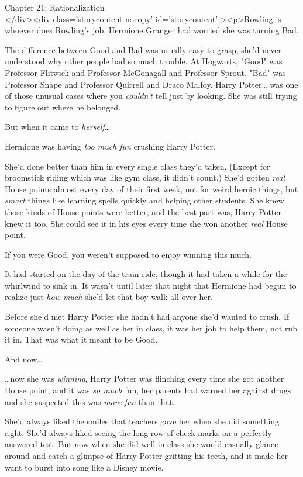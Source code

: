 
Chapter 21: Rationalization\\
</div><div  class='storycontent nocopy' id='storycontent' ><p>Rowling is 
whoever does Rowling's job.
\sbreak
Hermione Granger had worried she was turning Bad.

The difference between Good and Bad was usually easy to grasp, she'd never 
understood why other people had so much trouble. At Hogwarts, "Good" was 
Professor Flitwick and Professor McGonagall and Professor Sprout. "Bad" was 
Professor Snape and Professor Quirrell and Draco Malfoy. Harry Potter{\ldots} 
was one of those unusual cases where you \emph{couldn't} tell just by looking. 
She was still trying to figure out where he belonged.

But when it came to \emph{herself}{\ldots}

Hermione was having \emph{too much fun} crushing Harry Potter.

She'd done better than him in every single class they'd taken. (Except for 
broomstick riding which was like gym class, it didn't count.) She'd gotten 
\emph{real} House points almost every day of their first week, not for weird 
heroic things, but \emph{smart} things like learning spells quickly and helping 
other students. She knew those kinds of House points were better, and the best 
part was, Harry Potter knew it too. She could see it in his eyes every time she 
won another \emph{real} House point.

If you were Good, you weren't supposed to enjoy winning this much.

It had started on the day of the train ride, though it had taken a while for 
the whirlwind to sink in. It wasn't until later that night that Hermione had 
begun to realize just \emph{how much} she'd let that boy walk all over her.

Before she'd met Harry Potter she hadn't had anyone she'd wanted to crush. If 
someone wasn't doing as well as her in class, it was her job to help them, not 
rub it in. That was what it meant to be Good.

And now{\ldots}

{\ldots}now she was \emph{winning}, Harry Potter was flinching every time she 
got another House point, and it was \emph{so much} fun, her parents had warned 
her against drugs and she suspected this was \emph{more fun} than that.

She'd always liked the smiles that teachers gave her when she did something 
right. She'd always liked seeing the long row of check-marks on a perfectly 
answered test. But now when she did well in class she would casually glance 
around and catch a glimpse of Harry Potter gritting his teeth, and it made her 
want to burst into song like a Disney movie.

